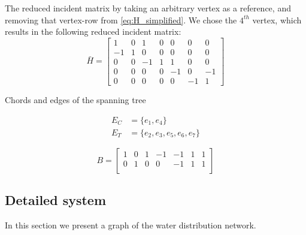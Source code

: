 The reduced incident matrix by taking an arbitrary vertex as a reference, and removing that vertex-row from \cref{eq:H_simplified}. We chose the $4^{th}$ vertex, which results in the following reduced incident matrix:
\begin{equation}
	\bar{H} = \begin{bmatrix}
		1 & 0 & 1 & 0 & 0 & 0 & 0\\
		-1 & 1 & 0 & 0 & 0 & 0 & 0\\
		0 & 0 & -1 & 1 & 1 & 0 & 0\\
		0 & 0 & 0 & 0 & -1 &  0  & -1\\
		0 & 0 & 0 & 0 & 0 & -1 & 1
	\end{bmatrix}
\end{equation}

Chords and edges of the spanning tree

\begin{equation} 
	\begin{split}
		E_{C} &= \{e_{1},e_{4}\}   \\ E_{T} &= \{e_2,e_3,e_5,e_6,e_7\}
	\end{split}
\end{equation}


\begin{equation}
	B = \begin{bmatrix}
		1 & 0 & 1 & -1 & -1 & 1 & 1\\
		0 & 1 & 0 & 0 & -1 & 1 & 1\\
	\end{bmatrix}
\end{equation}
\newpage

\subsection{Detailed system}
In this section we present a graph of the water distribution network.

